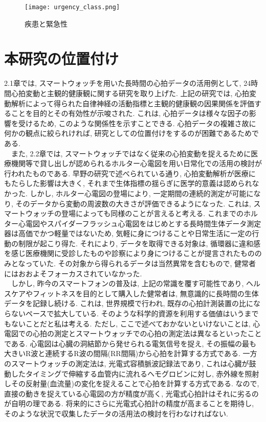 \documentclass[report, 11pt, a4paper]{jsbook}
\begin{document}
\begin{figure}[H]
\centering
\texttt{[image: urgency\_class.png]}
\caption{疾患と緊急性}
\label{fig:goolge_trends}
\end{figure}


\section{本研究の位置付け}
2.1章では, スマートウォッチを用いた長時間の心拍データの活用例として, 24時間心拍変動と主観的健康観に関する研究を取り上げた. 上記の研究では, 心拍変動解析によって得られた自律神経の活動指標と主観的健康観の因果関係を評価することを目的とその有効性が示唆された. これは, 心拍データは様々な因子の影響を受けるため, このような関係性を示すことできる. 心拍データの複雑さ故に何かの観点に絞られければ, 研究としての位置付けをするのが困難であるためである.\\
　また, 2.2章では, スマートウォッチではなく従来の心拍変動を捉えるために医療機関等で貸し出しが認められるホルター心電図を用い日常化での活用の検討が行われたものである. 早野の研究で述べられている通り, 心拍変動解析が医療にもたらした影響は大きく, それまで生体指標の揺らぎに医学的意義は認められなかった. しかし, ホルター心電図の登場により, 一定期間の連続的測定が可能になり, そのデータから変動の周波数の大きさが評価できるようになった. これは, スマートウォッチの登場によっても同様のことが言えると考える. これまでのホルター心電図やスパイダーフラッシュ心電図をはじめとする長時間生体データ測定器は高価でかつ軽量ではないため, 気軽に身につけることや日常生活に一定の行動の制限が起こり得た. それにより, データを取得できる対象は, 循環器に違和感を感じ医療機関に受診したものや診察により身につけることが提言されたもののみとなっていた. その対象から得られるデータは当然異常を含むもので, 健常者にはおおよそフォーカスされていなかった. \\
　しかし, 昨今のスマートフォンの普及は, 上記の常識を覆す可能性であり, ヘルスケアやフィットネスを目的として購入した健常者は, 無意識的に長時間の生体データを記録し続ける. これは, 世界規模で行われ, 既存の心拍計測装置の比にならないペースで拡大している. そのような科学的資源を利用する価値はいうまでもないことだと私は考える. ただし, ここで述べておかないといけないことは, 心電図での心拍の測定とスマートウォッチでの心拍の測定法は異なるといったことである. 心電図は心臓の洞結節から発せられる電気信号を捉え, その振幅の最も大きいR波と連続するR波の間隔(RR間隔)から心拍を計算する方式である. 一方のスマートウォッチの測定法は, 光電式容積脈波記録法であり, これは心臓が鼓動したタイミングで伸縮する血管内に流れるヘモグロビンに対し, 赤外線を照射しその反射量(血流量)の変化を捉えることで心拍を計算する方式である. なので, 直接の動きを捉えている心電図の方が精度が高く, 光電式心拍計はそれに劣るのが自明の理である. 将来的にさらに光電式心拍計の精度が高まることを期待し, そのような状況で収集したデータの活用法の検討を行わなければない.\\
\end{document}
